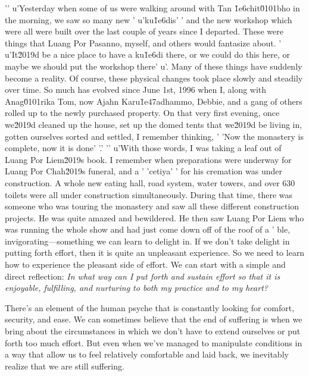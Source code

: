 '\n'
u'Yesterday when some of us were walking around with Tan \u1e6chit\u0101bho in the morning, we saw so many new '
u'ku\u1e6dis'
' and the new workshop which were all were built over the last couple of years since I departed. These were things that Luang Por Pasanno, myself, and others would fantasize about. '
u'It\u2019d be a nice place to have a ku\u1e6di there, or we could do this here, or maybe we should put the workshop there'
u'. Many of these things have suddenly become a reality. Of course, these physical changes took place slowly and steadily over time. So much has evolved since June 1st, 1996 when I, along with Anag\u0101rika Tom, now Ajahn Karu\u1e47adhammo, Debbie, and a gang of others rolled up to the newly purchased property. On that very first evening, once we\u2019d cleaned up the house, set up the domed tents that we\u2019d be living in, gotten ourselves sorted and settled, I remember thinking, '
'Now the monastery is complete, now it is done'
'.'
'\n'
u'With those words, I was taking a leaf out of Luang Por Liem\u2019s book. I remember when preparations were underway for Luang Por Chah\u2019s funeral, and a '
'cetiya'
' for his cremation was under construction. A whole new eating hall, road system, water towers, and over 630 toilets were all under construction simultaneously. During that time, there was someone who was touring the monastery and saw all these different construction projects. He was quite amazed and bewildered. He then saw Luang Por Liem who was running the whole show and had just come down off of the roof of a '
ble, invigorating---something we can 
learn to delight in. If we don't take delight in putting forth effort, 
then it is quite an unpleasant experience. So we need to learn how to 
experience the pleasant side of effort. We can start with a simple and 
direct reflection: \emph{In what way can I put forth and sustain effort 
so that it is enjoyable, fulfilling, and nurturing to both my practice 
and to my heart?}


There's an element of the human psyche that is constantly looking for 
comfort, security, and ease. We can sometimes believe that the end of 
suffering is when we bring about the circumstances in which we don't 
have to extend ourselves or put forth too much effort. But even when 
we've managed to manipulate conditions in a way that allow us to feel 
relatively comfortable and laid back, we inevitably realize that we are 
still suffering.

